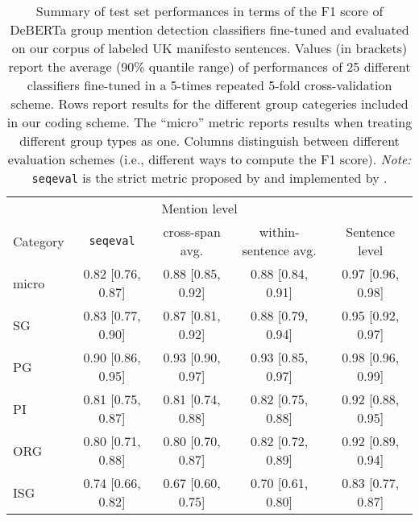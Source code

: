 \begin{table}[!h]

\caption{\label{tab:uk-manifestos_5x5-crossval_deberta-finetuning_testset_by_cat}Summary of test set performances in terms of the F1 score of DeBERTa group mention detection classifiers fine-tuned and evaluated on our corpus of labeled UK manifesto sentences. Values  (in brackets) report the average (90\% quantile range) of performances of 25 different classifiers fine-tuned in a 5-times repeated 5-fold cross-validation scheme. Rows report results for the different group categeries included in our coding scheme. The ``micro'' metric reports results when treating different group types as one. Columns distinguish between different evaluation schemes (i.e., different ways to compute the F1 score). \emph{Note:} \texttt{seqeval} is the strict metric proposed by \citet{ramshaw_text_1995} and implemented by \citet{nakayama_seqeval_2018}.}
\centering
\fontsize{10}{12}\selectfont
\begin{tabular}[t]{lcccc}
\toprule
\multicolumn{1}{c}{ } & \multicolumn{3}{c}{Mention level} & \multicolumn{1}{c}{ } \\
\cmidrule(l{3pt}r{3pt}){2-4}
Category & \texttt{seqeval} & cross-span avg. & within-sentence avg. & Sentence level\\
\midrule
micro & 0.82 [0.76, 0.87] & 0.88 [0.85, 0.92] & 0.88 [0.84, 0.91] & 0.97 [0.96, 0.98]\\
SG & 0.83 [0.77, 0.90] & 0.87 [0.81, 0.92] & 0.88 [0.79, 0.94] & 0.95 [0.92, 0.97]\\
PG & 0.90 [0.86, 0.95] & 0.93 [0.90, 0.97] & 0.93 [0.85, 0.97] & 0.98 [0.96, 0.99]\\
PI & 0.81 [0.75, 0.87] & 0.81 [0.74, 0.88] & 0.82 [0.75, 0.88] & 0.92 [0.88, 0.95]\\
ORG & 0.80 [0.71, 0.88] & 0.80 [0.70, 0.87] & 0.82 [0.72, 0.89] & 0.92 [0.89, 0.94]\\
ISG & 0.74 [0.66, 0.82] & 0.67 [0.60, 0.75] & 0.70 [0.61, 0.80] & 0.83 [0.77, 0.87]\\
\bottomrule
\end{tabular}
\end{table}
